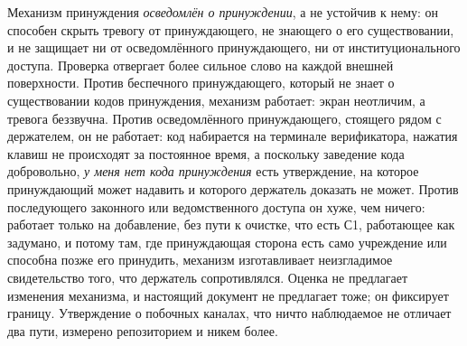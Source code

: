 Механизм принуждения \emph{осведомлён о принуждении}, а не устойчив к нему: он способен скрыть
тревогу от принуждающего, не знающего о его существовании, и не защищает ни от осведомлённого
принуждающего, ни от институционального доступа. Проверка отвергает более сильное слово на каждой
внешней поверхности. Против беспечного принуждающего, который не знает о существовании кодов
принуждения, механизм работает: экран неотличим, а тревога беззвучна. Против осведомлённого
принуждающего, стоящего рядом с держателем, он не работает: код набирается на терминале
верификатора, нажатия клавиш не происходят за постоянное время, а поскольку заведение кода
добровольно, \emph{у меня нет кода принуждения} есть утверждение, на которое принуждающий может
надавить и которого держатель доказать не может. Против последующего законного или ведомственного
доступа он хуже, чем ничего:  работает только на добавление, без пути к
очистке, что есть С1, работающее как задумано, и потому там, где принуждающая сторона есть само
учреждение или способна позже его принудить, механизм изготавливает неизгладимое свидетельство
того, что держатель сопротивлялся. Оценка не предлагает изменения механизма, и настоящий документ
не предлагает тоже; он фиксирует границу. Утверждение о побочных каналах, что ничто наблюдаемое не
отличает два пути, измерено репозиторием и никем более. \sExt

